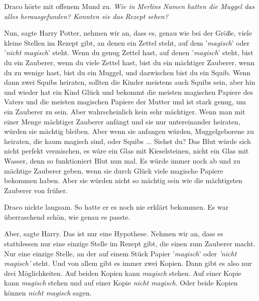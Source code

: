 Draco hörte mit offenem Mund zu. \emph{Wie in Merlins Namen hatten die Muggel
das alles herausgefunden? Konnten sie das Rezept sehen?}

\glqq{}Nun\grqq{}, sagte Harry Potter, \glqq{}nehmen wir an, dass es, genau wie
bei der Größe, viele kleine Stellen im Rezept gibt, an denen ein Zettel steht,
auf dem '\emph{magisch}' oder '\emph{nicht magisch}' steht. Wenn du genug Zettel
hast, auf denen '\emph{magisch}' steht, bist du ein Zauberer, wenn du viele
Zettel hast, bist du ein mächtiger Zauberer, wenn du zu wenige hast, bist du ein
Muggel, und dazwischen bist du ein Squib. Wenn dann zwei Squibs heiraten,
sollten die Kinder meistens auch Squibs sein, aber hin und wieder hat ein Kind
Glück und bekommt die meisten magischen Papiere des Vaters und die meisten
magischen Papiere der Mutter und ist stark genug, um ein Zauberer zu sein. Aber
wahrscheinlich kein sehr mächtiger. Wenn man mit einer Menge mächtiger Zauberer
anfängt und sie nur untereinander heiraten, würden sie mächtig bleiben. Aber
wenn sie anfangen würden, Muggelgeborene zu heiraten, die kaum magisch sind,
oder Squibs ... Siehst du? Das Blut würde sich nicht perfekt vermischen, es wäre
ein Glas mit Kieselsteinen, nicht ein Glas mit Wasser, denn so funktioniert Blut
nun mal. Es würde immer noch ab und zu mächtige Zauberer geben, wenn sie durch
Glück viele magische Papiere bekommen haben. Aber sie würden nicht so mächtig
sein wie die mächtigsten Zauberer von früher.\grqq{}

Draco nickte langsam. So hatte er es noch nie erklärt bekommen. Es war
überraschend schön, wie genau es passte.

\glqq{}Aber\grqq{}, sagte Harry. \glqq{}Das ist nur eine Hypothese. Nehmen wir
an, dass es stattdessen nur eine einzige Stelle im Rezept gibt, die einen zum
Zauberer macht. Nur eine einzige Stelle, an der auf einem Stück Papier
'\emph{magisch}' oder \emph{'nicht magisch'} steht. Und von allem gibt es immer
zwei Kopien. Dann gibt es also nur drei Möglichkeiten. Auf beiden Kopien kann
\glqq{}\emph{magisch}\grqq{} stehen. Auf einer Kopie kann \glqq{}
\emph{magisch}\grqq{} stehen und auf einer Kopie \glqq{}\emph{nicht
magisch\grqq{}}. Oder beide Kopien können \emph{\glqq{}nicht magisch\grqq{}}
sagen.

